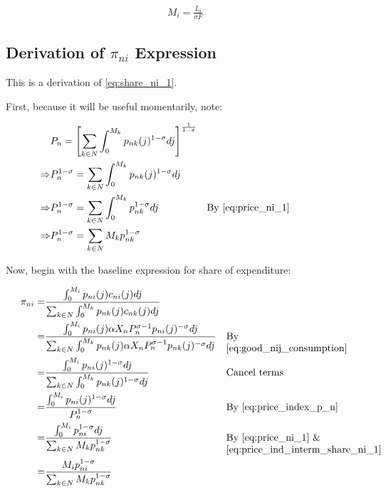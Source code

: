 \documentclass[10pt]{article}
\begin{document}
\begin{align}
    M_i = \frac{L_i}{\sigma F}
\end{align}

\subsection{Derivation of $\pi_{n i}$ Expression}
\label{sec:share_ni_1}

This is a derivation of \eqref{eq:share_ni_1}.

First, because it will be useful momentarily, note:

\begin{align}
    &P_n=\left[\sum_{k \in N} \int_0^{M_k} p_{n k}(j)^{1-\sigma} d j\right]^{\frac{1}{1-\sigma}} \\
    \Rightarrow &P_n^{1-\sigma} = \sum_{k \in N} \int_0^{M_k} p_{n k}(j)^{1-\sigma} d j \\
    \Rightarrow &P_n^{1-\sigma} = \sum_{k \in N} \int_0^{M_k} p_{nk}^{1-\sigma} d j && \parbox[t]{4cm}{\raggedright By \eqref{eq:price_ni_1}} \\
    \Rightarrow &P_n^{1-\sigma} = \sum_{k \in N} M_k p_{nk}^{1-\sigma} \label{eq:price_ind_interm_share_ni_1}
\end{align}

Now, begin with the baseline expression
for share of expenditure:

\begin{align}
    \pi_{n i}=&\frac{\int_0^{M_i} p_{n i}(j) c_{n i}(j) d j}{\sum_{k \in N} \int_0^{M_k} p_{n k}(j) c_{n k}(j) d j} \\
    = &\frac{\int_0^{M_i} p_{n i}(j) \alpha X_n P_n^{\sigma-1} p_{n i}(j)^{-\sigma} d j}{\sum_{k \in N} \int_0^{M_k} p_{n k}(j) \alpha X_n P_n^{\sigma-1} p_{n k}(j)^{-\sigma} d j} && \parbox[t]{4cm}{\raggedright By \eqref{eq:good_nij_consumption}} \\
    = &\frac{\int_0^{M_i} p_{ni}(j)^{1-\sigma} d j}{\sum_{k \in N} \int_0^{M_k} p_{nk}(j)^{1-\sigma} d j} && \parbox[t]{4cm}{\raggedright Cancel terms} \\
    = &\frac{\int_0^{M_i} p_{ni}(j)^{1-\sigma} d j}{P_n^{1-\sigma}} && \parbox[t]{4cm}{\raggedright By \eqref{eq:price_index_p_n}} \\
    = &\frac{\int_0^{M_i} p_{ni}^{1-\sigma} d j}{\sum_{k \in N} M_k p_{nk}^{1-\sigma}} && \parbox[t]{4cm}{\raggedright By \eqref{eq:price_ni_1} \& \eqref{eq:price_ind_interm_share_ni_1}} \\
    = &\frac{M_i p_{ni}^{1-\sigma}}{\sum_{k \in N} M_k p_{nk}^{1-\sigma}}
\end{align}
\end{document}
